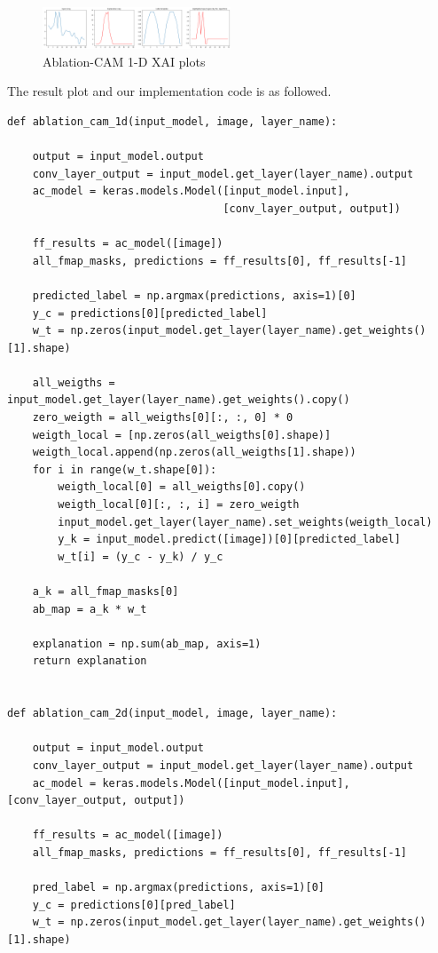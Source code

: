 \documentclass[conference]{IEEEtran}
\begin{document}
\begin{figure}[h] 
    \centering
    \includegraphics[width=0.5\textwidth]{./graphs/abd.png}
    \caption{Ablation-CAM 1-D XAI plots} 
\end{figure}

The result plot and our implementation code is as followed.

\begin{lstlisting}
def ablation_cam_1d(input_model, image, layer_name):

    output = input_model.output
    conv_layer_output = input_model.get_layer(layer_name).output
    ac_model = keras.models.Model([input_model.input],
                                  [conv_layer_output, output])

    ff_results = ac_model([image])
    all_fmap_masks, predictions = ff_results[0], ff_results[-1]

    predicted_label = np.argmax(predictions, axis=1)[0]
    y_c = predictions[0][predicted_label]
    w_t = np.zeros(input_model.get_layer(layer_name).get_weights()[1].shape)

    all_weigths = input_model.get_layer(layer_name).get_weights().copy()
    zero_weigth = all_weigths[0][:, :, 0] * 0
    weigth_local = [np.zeros(all_weigths[0].shape)]
    weigth_local.append(np.zeros(all_weigths[1].shape))
    for i in range(w_t.shape[0]):
        weigth_local[0] = all_weigths[0].copy()
        weigth_local[0][:, :, i] = zero_weigth
        input_model.get_layer(layer_name).set_weights(weigth_local)
        y_k = input_model.predict([image])[0][predicted_label]
        w_t[i] = (y_c - y_k) / y_c

    a_k = all_fmap_masks[0]
    ab_map = a_k * w_t

    explanation = np.sum(ab_map, axis=1)
    return explanation


def ablation_cam_2d(input_model, image, layer_name):

    output = input_model.output
    conv_layer_output = input_model.get_layer(layer_name).output
    ac_model = keras.models.Model([input_model.input], [conv_layer_output, output])

    ff_results = ac_model([image])
    all_fmap_masks, predictions = ff_results[0], ff_results[-1]

    pred_label = np.argmax(predictions, axis=1)[0]
    y_c = predictions[0][pred_label]
    w_t = np.zeros(input_model.get_layer(layer_name).get_weights()[1].shape)


\end{lstlisting}
\end{document}
